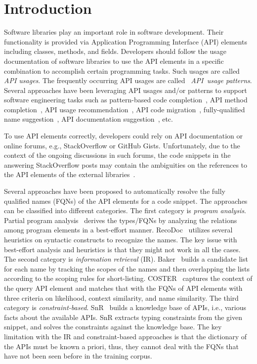 \section{Introduction}
\label{sec:intro}

Software libraries play an important role in software
development. Their functionality is provided via Application
Programming Interface (API) elements including classes, methods, and
fields. Developers should follow the usage documentation of software
libraries to use the API elements in a specific combination to
accomplish certain programming tasks. Such usages are called {\em API
  usages}. The frequently occurring API usages are called~{\em
  API~usage patterns}. Several approaches have been leveraging API
usages and/or patterns to support software engineering tasks such as
pattern-based code completion~\cite{icse12}, API method
completion~\cite{fse16}, API usage recommendation~\cite{icsme18}, API
code migration~\cite{ase14}, fully-qualified name
suggestion~\cite{icse18}, API documentation
suggestion~\cite{liveapi14}, etc.

To use API elements correctly, developers could rely on API
documentation or online forums, e.g., StackOverflow or GitHub
Gists. Unfortunately, due to the context of the ongoing discussions in
such forums, the code snippets in the answering StackOverflow posts
may contain the ambiguities on the references to the API elements of
the external libraries~\cite{liveapi14}.

Several approaches have been proposed to automatically resolve the
fully qualified names (FQNs) of the API elements for a code
snippet. The approaches can be classified into different
categories. The first category is {\em program analysis}. Partial
program analysis~\cite{dagenais-oopsla08} derives the types/FQNs by
analyzing the relations among program elements in a best-effort
manner. RecoDoc~\cite{dagenais-icse12} utilizes several heuristics on
syntactic constructs to recognize the names. The key issue with
best-effort analysis and heuristics is that they might not work in all
the cases. The second category is {\em information retrieval}
(IR). Baker~\cite{liveapi14} builds a candidate list for each name by
tracking the scopes of the names and then overlapping the lists
according to the scoping rules for short-listing.
COSTER~\cite{coster-ase19} captures the context of the query API
element and matches that with the FQNs of API elements with three
criteria on likelihood, context similarity, and name similarity.  The
third category is {\em constraint-based}. SnR~\cite{snr-icse22} builds
a knowledge base of APIs, i.e., various facts about the available
APIs. SnR extracts typing constraints from the given snippet, and
solves the constraints against the knowledge base. The key limitation
with the IR and constraint-based approaches is that the dictionary of
the APIs must be known a priori, thus, they cannot deal with the FQNs
that have not been seen before in the training corpus.

